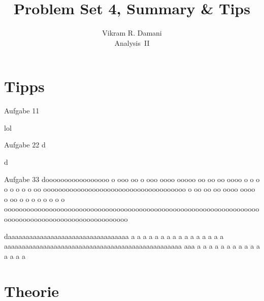 \documentclass[12pt]{article}
\begin{document}
\title{\vspace*{-2.5em}Problem Set 4, Summary \& Tips}
\author{Vikram R. Damani\\
    Analysis~II}

\maketitle


\section{Tipps}

\begin{nexercise}{Aufgabe 1}{1}
\end{nexercise}

\begin{tips}{1}
    lol
\end{tips}\vspace*{1em}

\begin{nexercise}{Aufgabe 2}{2}
    d
\end{nexercise}

\begin{tips}{2}
    d
\end{tips}\vspace*{1em}

\begin{nexercise}{Aufgabe 3}{3}
    dooooooooooooooooo o ooo oo o ooo oooo ooooo oo oo oo oooo o o o o o o o o oo oooooooooooooooooooooooooooooooooooooo o oo oo oo oooo oooo o oo o o o o o  o o o ooooooooooooooooooooooooooooooooooooooooooooooooooooooooooooooooooooooooooooooooooooooooooooooooooooo
\end{nexercise}

\begin{tips}{3}
    daaaaaaaaaaaaaaaaaaaaaaaaaaaaaaaaaa a a a a a a  a a a  a a  a  a a  a a aaaaaaaaaaaaaaaaaaaaaaaaaaaaaaaaaaaaaaaaaaaaaaaaaa aaa  a a  a a  a a  a a a a a a a a a
\end{tips}

\section{Theorie}

\end{document}
